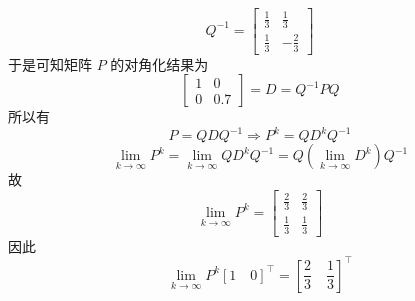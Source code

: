 \documentclass{article}
\begin{document}
	\begin{equation}
	Q^{-1} = \begin{bmatrix}
		     \frac{1}{3} & \frac{1}{3} \\
			 \frac{1}{3} & -\frac{2}{3}
			 \end{bmatrix}
	\end{equation}
	于是可知矩阵 $P$ 的对角化结果为
	\begin{equation}
	\begin{bmatrix}
	1 & 0 \\
	0 & 0.7 
	\end{bmatrix} = D = Q^{-1}PQ
	\end{equation}
	所以有
	\begin{equation}
	P = QDQ^{-1} \Rightarrow P^{k} = QD^{k}Q^{-1}
	\end{equation}
	\begin{equation}
	\lim_{k\rightarrow \infty} P^{k} = \lim_{k\rightarrow \infty} QD^{k}Q^{-1} = Q \left( \lim_{k\rightarrow \infty}D^{k} \right) Q^{-1}
	\end{equation}
	故
	\begin{equation}
	\lim_{k\rightarrow \infty} P^{k} = \begin{bmatrix}
									   \frac{2}{3} & \frac{2}{3} \\
									   \frac{1}{3} & \frac{1}{3} 
									   \end{bmatrix}
	\end{equation}
	因此
	\begin{equation}
	\lim_{k\rightarrow \infty} P^{k} [1\quad 0]^\top = [\frac{2}{3}\quad \frac{1}{3}]^\top
	\end{equation} \\
\end{document}
